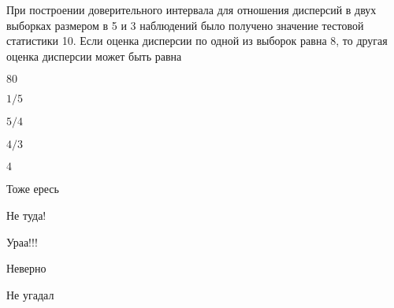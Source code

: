 
\begin{question}
При построении доверительного интервала для отношения дисперсий в двух
выборках размером в 5 и 3 наблюдений было получено значение тестовой
статистики 10. Если оценка дисперсии по одной из выборок равна 8, то
другая оценка дисперсии может быть равна
\begin{answerlist}
  \item \(80\)
  \item \(1/5\)
  \item \(5/4\)
  \item \(4/3\)
  \item \(4\)
\end{answerlist}
\end{question}

\begin{solution}
\begin{answerlist}
  \item Тоже ересь
  \item Не туда!
  \item Ураа!!!
  \item Неверно
  \item Не угадал
\end{answerlist}
\end{solution}

